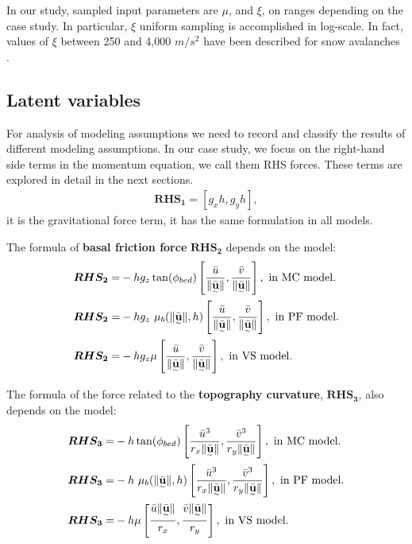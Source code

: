 \documentclass{article}
\begin{document}
In our study, sampled input parameters are $\mu$, and $\xi$, on ranges depending on the case study. In particular, $\xi$ uniform sampling is accomplished in log-scale. In fact, values of $\xi$ between 250 and 4,000 $m/s^2$ have been described for snow avalanches \citep{Salm1993,Bartelt1999,Gruber2007}.

\subsection{Latent variables}\label{sec:Fterms}
For analysis of modeling assumptions we need to record and classify the results of different modeling assumptions. In our case study, we focus on the right-hand side terms in the momentum equation, we call them RHS forces. These terms are explored in detail in the next sections.
\begin{align}
\boldsymbol{RHS_1} = [g_x h,g_y h],
\end{align}
it is the gravitational force term, it has the same formulation in all models.

The formula of {\bf basal friction force} $\boldsymbol{RHS_2}$ depends on the model:
\begin{align}
\boldsymbol{RHS_2} =& -h g_z\tan(\phi_{bed})\left[\frac{\bar{u}}{\| \underset{^\sim}{\bar{\textbf u}} \|}, \frac{\bar{v}}{\| \underset{^\sim}{\bar{\textbf u}} \|} \right],\textmd{ in MC model.}\nonumber\\
\boldsymbol{RHS_2} =& - h g_z \ \mu_{b}(\|\underset{^\sim}{\bar{\textbf{u}}} \| , h)\left[\frac{\bar{u}}{\| \underset{^\sim}{\bar{\textbf{u}}} \|}, \frac{\bar{v}}{\| \underset{^\sim}{\bar{\textbf{u}}} \|}\right],\textmd{ in PF model.}\\
\boldsymbol{RHS_2} =& -h g_{z} \mu\left[\frac{\bar{u}}{\| \underset{^\sim}{\bar{\textbf u}}\|} , \frac{\bar{v}}{\| \underset{^\sim}{\bar{\textbf u}}\|}\right],\textmd{ in VS model.}\nonumber
\end{align}

The formula of the force related to the {\bf topography curvature}, $\boldsymbol{RHS_3}$, also depends on the model:
\begin{align}
\boldsymbol{RHS_3} =&-h \tan(\phi_{bed})\left[\frac{\bar{u}^3}{r_x\| \underset{^\sim}{\bar{\textbf{u}}} \|}, \frac{\bar{v}^3}{r_y\| \underset{^\sim}{\bar{\textbf{u}}} \|}\right],\textmd{ in MC model.}\nonumber\\
\boldsymbol{RHS_3} =& -h\ \mu_{b}(\|\underset{^\sim}{\bar{\textbf{u}}} \|,h)\left[\frac{\bar{u}^3}{r_x\| \underset{^\sim}{\bar{\textbf{u}}} \|}, \frac{\bar{v}^3}{r_y\| \underset{^\sim}{\bar{\textbf{u}}} \|}\right],\textmd{ in PF model.}\\
\boldsymbol{RHS_3} =& -h \mu\left[\frac{\bar{u}\| \underset{^\sim}{\bar{\textbf u}} \|}{r_{x}},\frac{\bar{v}\| \underset{^\sim}{\bar{\textbf u}} \|}{r_{y}}\right],\textmd{ in VS model.}\nonumber
\end{align}
\end{document}

